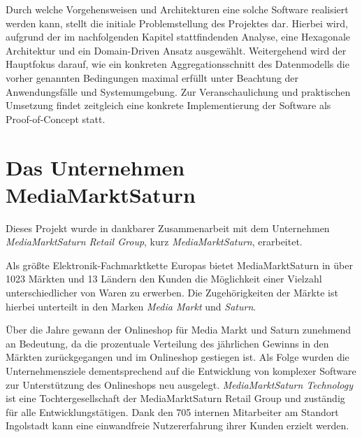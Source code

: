 Durch welche Vorgehensweisen und Architekturen eine solche Software realisiert werden kann, stellt die initiale Problemstellung des Projektes dar. Hierbei wird, aufgrund der im nachfolgenden Kapitel stattfindenden Analyse, eine Hexagonale Architektur und ein Domain-Driven Ansatz ausgewählt. Weitergehend wird der Hauptfokus darauf, wie ein konkreten Aggregationsschnitt des Datenmodells die vorher genannten Bedingungen maximal erfüllt unter Beachtung der Anwendungsfälle und Systemumgebung. Zur Veranschaulichung und praktischen Umsetzung findet zeitgleich eine konkrete Implementierung der Software als Proof-of-Concept statt.







\section{Das Unternehmen MediaMarktSaturn}

Dieses Projekt wurde in dankbarer Zusammenarbeit mit dem Unternehmen \emph{MediaMarktSaturn Retail Group}, kurz \emph{MediaMarktSaturn}, erarbeitet. %

Als größte Elektronik-Fachmarktkette Europas bietet MediaMarktSaturn in über 1023 Märkten und 13 Ländern den Kunden die Möglichkeit einer Vielzahl unterschiedlicher von Waren zu erwerben. Die Zugehörigkeiten der Märkte ist hierbei unterteilt in den Marken \emph{Media Markt} und \emph{Saturn}. %

Über die Jahre gewann der Onlineshop für Media Markt und Saturn zunehmend an Bedeutung, da die prozentuale Verteilung des jährlichen Gewinns in den Märkten zurückgegangen und im Onlineshop gestiegen ist. Als Folge wurden die Unternehmensziele dementsprechend auf die Entwicklung von komplexer Software zur Unterstützung des Onlineshops neu ausgelegt. \emph{MediaMarktSaturn Technology} ist eine Tochtergesellschaft der MediaMarktSaturn Retail Group und zuständig für alle Entwicklungstätigen. Dank den 705 internen Mitarbeiter am Standort Ingolstadt kann eine einwandfreie Nutzererfahrung ihrer Kunden erzielt werden. 

